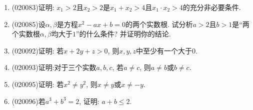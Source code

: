 \documentclass[10pt,a4paper]{article}
\begin{document}
\begin{enumerate}[1.]
\vspace*{24ex}
\item {\tiny (020083)}证明: $x_1>2$且$x_2>2$是$x_1+x_2>4$且$x_1\cdot x_2>4$的充分非必要条件.
\item {\tiny (020085)}设$\alpha,\beta$是方程$x^2-ax+b=0$的两个实数根. 试分析$a>2$且$b>1$是``两个实数根$\alpha,\beta$均大于$1$''的什么条件? 并证明你的结论.
\item {\tiny (020092)}证明: 若$x+2y+z>0$, 则$x,y,z$中至少有一个大于$0$.
\item {\tiny (020093)}证明:对于三个实数$a,b,c$, 若$a\ne c$, 则$a\ne b$或$b\ne c$.
\item {\tiny (020095)}证明: 若$x^2\ne y^2$, 则$x\ne y$或$x\ne -y$.
\item {\tiny (020096)}若$a^3+b^3=2$, 证明: $a+b\le 2$.
\end{enumerate}
\end{document}
